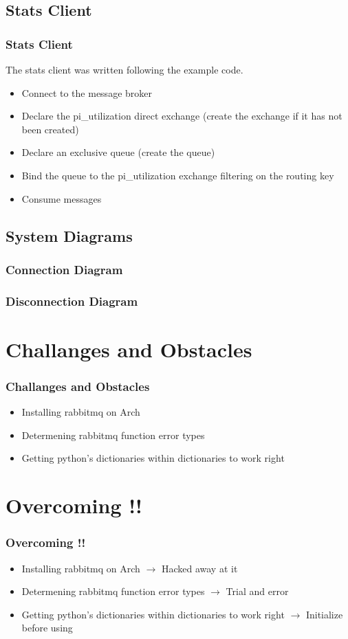 \documentclass[]{beamer}
\begin{document}
\subsection{Stats Client}
\begin{frame}
	\frametitle{Stats Client}
    The stats client was written following the example code.
    \begin{itemize}
    	\item Connect to the message broker
    	\item Declare the pi\_utilization direct exchange (create the exchange if it has not been created)
    	\item Declare an exclusive queue (create the queue)
        \item Bind the queue to the pi\_utilization exchange filtering on the routing key
        \item Consume messages
	\end{itemize}
\end{frame}

\subsection{System Diagrams}
\begin{frame}
	\frametitle{Connection Diagram}
\end{frame}


\begin{frame}
	\frametitle{Disconnection Diagram}
\end{frame}


\section{Challanges and Obstacles}
\begin{frame}
	\frametitle{Challanges and Obstacles}
    \begin{itemize}
    	\item Installing rabbitmq on Arch
    	\item Determening rabbitmq function error types
    	\item Getting python's dictionaries within dictionaries to work right
	\end{itemize}
\end{frame}


\section{Overcoming !!}
\begin{frame}
	\frametitle{Overcoming !!}
    \begin{itemize}
    	\item Installing rabbitmq on Arch $\rightarrow$ Hacked away at it
    	\item Determening rabbitmq function error types $\rightarrow$ Trial and error
    	\item Getting python's dictionaries within dictionaries to work right $\rightarrow$ Initialize before using
	\end{itemize}
\end{frame}
\end{document}
